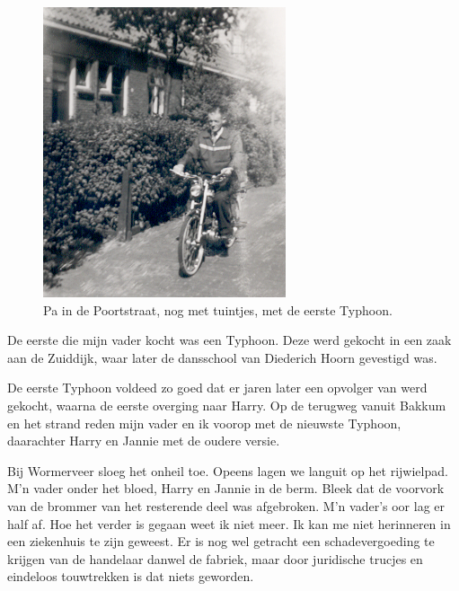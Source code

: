 \documentclass[10pt,twoside, openright]{memoir}
\begin{document}
\begin{figure}
\includegraphics[width=\textwidth]{img/ch20/Typhoon2-55A}
\caption*{\footnotesize Pa in de Poortstraat, nog met tuintjes, met de eerste Typhoon.}
\end{figure}

De eerste die mijn vader kocht was een Typhoon. Deze werd gekocht in een zaak aan de Zuiddijk, waar later de dansschool van Diederich Hoorn gevestigd was. 

De eerste Typhoon voldeed zo goed dat er jaren later een opvolger van werd gekocht, waarna de eerste overging naar Harry. Op de terugweg vanuit Bakkum en het strand reden mijn vader en ik voorop met de nieuwste Typhoon, daarachter Harry en Jannie met de oudere versie. 

Bij Wormerveer sloeg het onheil toe. Opeens lagen we languit op het rijwielpad. M'n vader onder het bloed, Harry en Jannie in de berm. Bleek dat de voorvork van de brommer van het resterende deel was afgebroken. M'n vader's oor lag er half af. Hoe het verder is gegaan weet ik niet meer. Ik kan me niet herinneren in een ziekenhuis te zijn geweest. Er is nog wel getracht een schadevergoeding te krijgen van de handelaar danwel de fabriek, maar door juridische trucjes en eindeloos touwtrekken is dat niets geworden. 
\end{document}

